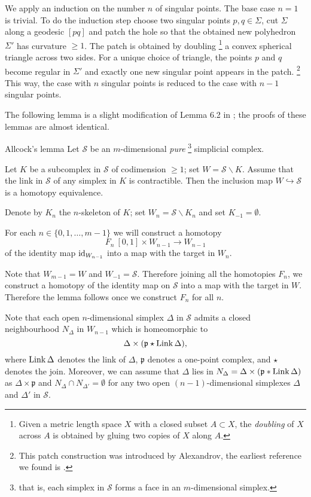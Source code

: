 \documentclass{compositio}
\begin{document}
We apply an induction on the number $n$ of singular points.
The base case $n=1$ is trivial.
To do the induction step
choose two singular points $p,q\in\Sigma$,
cut $\Sigma$ along a geodesic $[pq]$
and patch the hole so that the obtained new polyhedron $\Sigma'$ has curvature $\ge 1$.
The patch is obtained by doubling%
\footnote{Given a metric length space $X$ with a closed subset $A\subset X$,
the \emph{doubling} of $X$ across $A$ is obtained by gluing two copies of $X$ along $A$.}
 a convex spherical triangle across two sides.
For a unique choice of triangle, the points $p$ and $q$ become regular in $\Sigma'$
and exactly one new singular point appears in the patch.%
\footnote{This patch construction was introduced by Alexandrov,
the earliest reference we found is
\cite[VI, \S7]{alexandrov1948}.}
This way, the case with $n$ singular points is reduced to the case with $n-1$ singular points.
\qeds

The following lemma is a slight modification of Lemma 6.2 in \cite{allcock};
the proofs of these lemmas are almost identical.

\begin{thm}{Allcock's lemma}\label{lem:allcock}
Let $\mathcal{S}$ be an $m$-dimensional \emph{pure}%
\footnote{that is, each simplex in $\mathcal{S}$ forms a face in an $m$-dimensional simplex.} simplicial complex.

Let $K$ be a subcomplex in $\mathcal{S}$ of codimension $\ge 1$;
set $W=\mathcal{S}\backslash K$.
Assume that the link in  $\mathcal{S}$  of any simplex in $K$ is contractible.
Then the inclusion map $W\hookrightarrow\mathcal{S}$ is a homotopy equivalence.
\end{thm}


Denote by $K_n$ the $n$-skeleton of $K$;
set $W_n=\mathcal{S}\backslash K_n$
and
set $K_{-1}=\emptyset$.

For each $n\in \{0,1,\dots,m-1\}$
we will construct a homotopy
$$F_n\:[0,1]\times W_{n-1}\to W_{n-1}$$
of the identity map $\mathop{\rm id}\nolimits_{W_{n-1}}$
into a map with the target in $W_{n}$.

Note that $W_{m-1}=W$ and $W_{-1}=\mathcal{S}$.
Therefore joining all the homotopies $F_n$,
we construct a  homotopy of the identity map on ${\mathcal{S}}$ into a map with the target in $W$.
Therefore the lemma follows once we construct  $F_n$ for all $n$.

Note that each open $n$-dimensional simplex $\Delta$ in $\mathcal{S}$ admits a closed neighbourhood $N_\Delta$ in $W_{n-1}$ which is homeomorphic to
$$\Delta\times (\mathfrak{p}\star\mathop{\rm Link}\Delta),$$
where $\mathop{\rm Link}\Delta$ denotes the link of $\Delta$,
$\mathfrak{p}$ denotes a one-point complex, and ${\star}$ denotes the join.
Moreover, we can assume that $\Delta$ lies in $N_\Delta=\Delta\times (\mathfrak{p}*\mathop{\rm Link}\Delta)$ as $\Delta\times \mathfrak{p}$
and $N_\Delta\cap N_{\Delta'}=\emptyset$ for any two open $(n-1)$-dimensional simplexes $\Delta$ and $\Delta'$ in $\mathcal{S}$.
\end{document}
